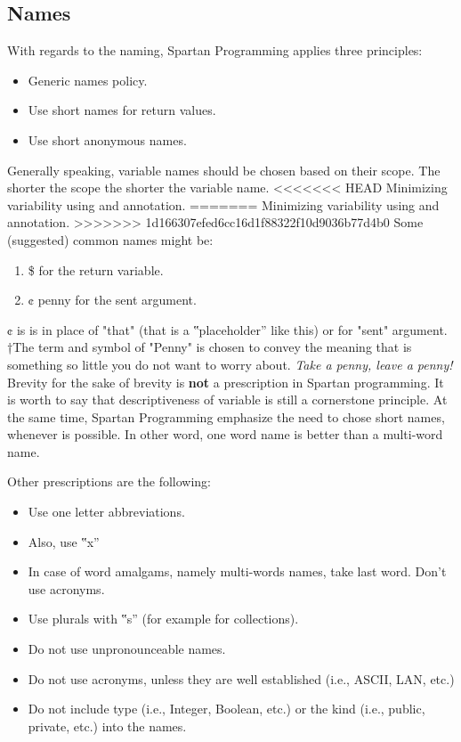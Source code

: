 \subsection{Names}
With regards to the naming, Spartan Programming applies three principles:
\begin{itemize}
 \item Generic names policy.
 \item Use short names for return values.
 \item Use short anonymous names.
\end{itemize}
Generally speaking, variable names should be chosen based on their scope.
The shorter the scope the shorter the variable name.
<<<<<<< HEAD
Minimizing variability using  and  annotation.
=======
Minimizing variability using  and  annotation. 
>>>>>>> 1d166307efed6cc16d1f88322f10d9036b77d4b0
Some (suggested) common names might be:
\begin{enumerate}
  \item \$ for the return variable.
  \item ¢ penny for the sent argument.
\end{enumerate}
¢ is is in place of "that" (that is a ‟placeholder” like this) or for "sent" argument.
†{The term and symbol of "Penny" is chosen to convey the meaning that is something so little you do not want to worry about.
\emph{Take a penny, leave a penny!}}
Brevity for the sake of brevity is \textbf{not} a prescription in Spartan programming.
It is worth to say that descriptiveness of variable is still a cornerstone principle.
At the same time, Spartan Programming emphasize the need to chose short names, whenever is possible.
In other word, one word name is better than a multi-word name.

Other prescriptions are the following:
\begin{itemize}
 \item Use one letter abbreviations.
 \item Also, use ‟x”
 \item In case of word amalgams, namely multi-words names, take last word.
   Don't use acronyms.

 \item Use plurals with ‟s” (for example for collections).

 \item Do not use unpronounceable names.
 \item Do not use acronyms, unless they are well established (i.e., ASCII, LAN,
   etc.)

 \item Do not include type (i.e., Integer, Boolean, etc.) or the kind (i.e.,
   public, private, etc.) into the names.

\end{itemize}

